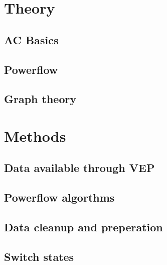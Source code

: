 \documentclass[a4paper]{report}
\begin{document}


\chapter{Theory}


\section{AC Basics}



\section{Powerflow}



\section{Graph theory}



\chapter{Methods}

\section{Data available through VEP}



\section{Powerflow algorthms}



\section{Data cleanup and preperation}



\section{Switch states}
\end{document}
